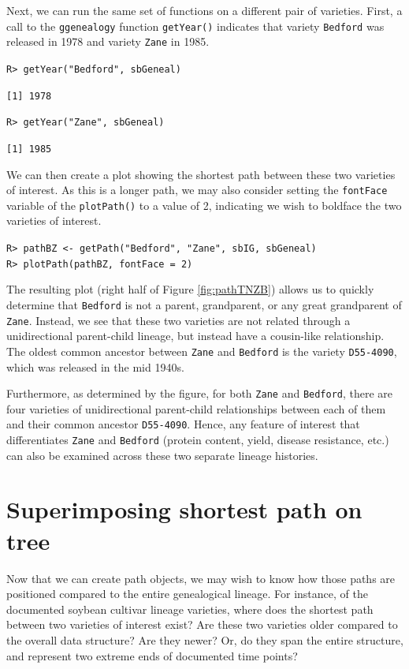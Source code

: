 \documentclass[11pt,a4paper,oldfontcommands,openany]{memoir}
\DeclareRobustCommand{\mybox}[2][gray!15]{%
\begin{tcolorbox}[   %
        breakable,
        left=0pt,
        right=0pt,
        top=0pt,
        bottom=0pt,
        colback=#1,
        colframe=#1,
        width=\dimexpr\textwidth\relax, 
        enlarge left by=0mm,
        boxsep=5pt,
        arc=0pt,outer arc=0pt,
        ]
        #2
\end{tcolorbox}
}
\numberwithin{equation}{section} %
\newcommand{\code}[1]{{\texttt{#1}}}
\newcommand{\pkg}[1]{{\texttt{#1}}}
\begin{document}
Next, we can run the same set of functions on a different pair of varieties. First, a call to the \pkg{ggenealogy} function \code{getYear()} indicates that variety \code{Bedford} was released in 1978 and variety \code{Zane} in 1985.

\mybox{
\texttt{R> getYear("Bedford", sbGeneal)}
}

\mybox[green!10]{
\texttt{[1] 1978}
}

\mybox{
\texttt{R> getYear("Zane", sbGeneal)}
}

\mybox[green!10]{
\texttt{[1] 1985}
}

We can then create a plot showing the shortest path between these two varieties of interest. As this is a longer path, we may also consider setting the \code{fontFace} variable of the \code{plotPath()} to a value of 2, indicating we wish to boldface the two varieties of interest.

\mybox{
\texttt{R> pathBZ <- getPath("Bedford", "Zane", sbIG, sbGeneal)}\\
\texttt{R> plotPath(pathBZ, fontFace = 2)}
}

The resulting plot (right half of Figure \ref{fig:pathTNZB}) allows us to quickly determine that \code{Bedford} is not a parent, grandparent, or any great grandparent of \code{Zane}. Instead, we see that these two varieties are not related through a unidirectional parent-child lineage, but instead have a cousin-like relationship. The oldest common ancestor between \code{Zane} and \code{Bedford} is the variety \code{D55-4090}, which was released in the mid 1940s.

Furthermore, as determined by the figure, for both \code{Zane} and \code{Bedford}, there are four varieties of unidirectional parent-child relationships between each of them and their common ancestor \code{D55-4090}. Hence, any feature of interest that differentiates \code{Zane} and \code{Bedford} (protein content, yield, disease resistance, etc.) can also be examined across these two separate lineage histories.

\section{Superimposing shortest path on tree}

Now that we can create path objects, we may wish to know how those paths are positioned compared to the entire genealogical lineage. For instance, of the documented soybean cultivar lineage varieties, where does the shortest path between two varieties of interest exist? Are these two varieties older compared to the overall data structure? Are they newer? Or, do they span the entire structure, and represent two extreme ends of documented time points?
\end{document}
